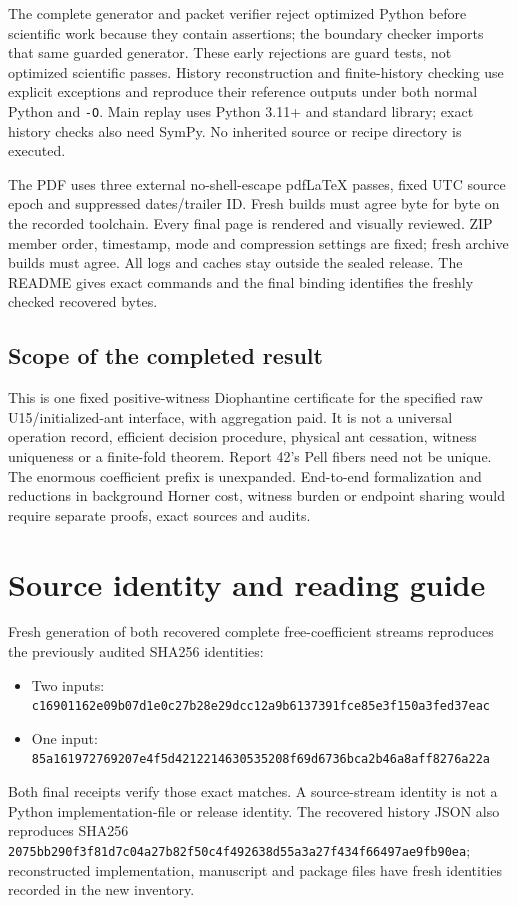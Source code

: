 \documentclass[11pt,letterpaper]{article}
\makeatletter
\theoremstyle{definition}\newtheorem{definition}[theorem]{Definition}
\theoremstyle{remark}\newtheorem{remark}[theorem]{Remark}
\newcommand{\ptrR}{}
\newcommand{\ptrappendix}{%
  \setcounter{section}{0}\def\Hy@chapapp{appendix}%
  \renewcommand{\thesection}{\ptrR.\Alph{section}}%
  \renewcommand{\theHsection}{\ptrR.\Alph{section}}}
\newcommand{\codeu}[1]{\nolinkurl{#1}}
\makeatother
\begin{document}
The complete generator and packet verifier reject optimized Python before scientific work because they contain assertions; the boundary checker imports that same guarded generator. These early rejections are guard tests, not optimized scientific passes. History reconstruction and finite-history checking use explicit exceptions and reproduce their reference outputs under both normal Python and \codeu{-O}. Main replay uses Python 3.11+ and standard library; exact history checks also need SymPy. No inherited source or recipe directory is executed.

The PDF uses three external no-shell-escape pdfLaTeX passes, fixed UTC source epoch and suppressed dates/trailer ID. Fresh builds must agree byte for byte on the recorded toolchain. Every final page is rendered and visually reviewed. ZIP member order, timestamp, mode and compression settings are fixed; fresh archive builds must agree. All logs and caches stay outside the sealed release. The README gives exact commands and the final binding identifies the freshly checked recovered bytes.

\subsection{Scope of the completed result}
This is one fixed positive-witness Diophantine certificate for the specified raw U15/initialized-ant interface, with aggregation paid. It is not a universal operation record, efficient decision procedure, physical ant cessation, witness uniqueness or a finite-fold theorem. Report 42's Pell fibers need not be unique. The enormous coefficient prefix is unexpanded. End-to-end formalization and reductions in background Horner cost, witness burden or endpoint sharing would require separate proofs, exact sources and audits.

\ptrappendix
\section{Source identity and reading guide}\label{ptr:pc:app:pins}
Fresh generation of both recovered complete free-coefficient streams reproduces the previously audited SHA256 identities:
\begin{itemize}
\item Two inputs: \codeu{c16901162e09b07d1e0c27b28e29dcc12a9b6137391fce85e3f150a3fed37eac}
\item One input: \codeu{85a161972769207e4f5d4212214630535208f69d6736bca2b46a8aff8276a22a}
\end{itemize}
Both final receipts verify those exact matches. A source-stream identity is not a Python implementation-file or release identity. The recovered history JSON also reproduces SHA256 \codeu{2075bb290f3f81d7c04a27b82f50c4f492638d55a3a27f434f66497ae9fb90ea}; reconstructed implementation, manuscript and package files have fresh identities recorded in the new inventory.
\end{document}
